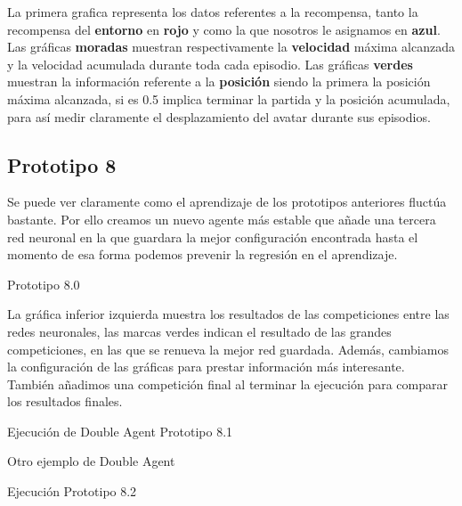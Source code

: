 La primera grafica representa los datos referentes a la recompensa, tanto la recompensa del \textbf{entorno} en \textbf{rojo} y como la que nosotros le asignamos en \textbf{azul}.
Las gráficas \textbf{moradas} muestran respectivamente la \textbf{velocidad} máxima alcanzada y la velocidad acumulada durante toda cada episodio.
Las gráficas \textbf{verdes} muestran la información referente a la \textbf{posición} siendo la primera la posición máxima alcanzada, si es 0.5 implica terminar la partida y la posición acumulada, para así medir claramente el desplazamiento del avatar durante sus episodios.

\subsection{Prototipo 8}
Se puede ver claramente como el aprendizaje de los prototipos anteriores fluctúa bastante. Por ello creamos un nuevo agente más estable que añade una tercera red neuronal en la que guardara la mejor configuración encontrada hasta el momento de esa forma podemos prevenir la regresión en el aprendizaje.

%
{Prototipo 8.0}

La gráfica inferior izquierda muestra los resultados de las competiciones entre las redes neuronales, las marcas verdes indican el resultado de las grandes competiciones, en las que se renueva la mejor red guardada.
Además, cambiamos la configuración de las gráficas para prestar información más interesante.
También añadimos una competición final al terminar la ejecución para comparar los resultados finales.

%
{Ejecución de Double Agent Prototipo 8.1}

%
{Otro ejemplo de Double Agent}

%
{Ejecución Prototipo 8.2}


